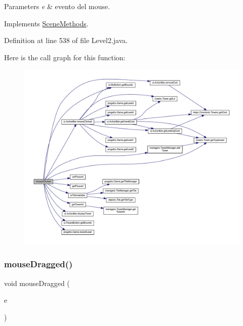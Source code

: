 \begin{DoxyParams}{Parameters}
{\em e} & evento del mouse. \\
\hline
\end{DoxyParams}


Implements \hyperlink{interfacescenes_1_1_scene_methods_a45d56bd84238e8b56589dfc732e2b2cf}{Scene\+Methods}.



Definition at line 538 of file Level2.\+java.

Here is the call graph for this function\+:\nopagebreak
\begin{figure}[H]
\begin{center}
\leavevmode
\includegraphics[width=350pt]{classscenes_1_1_level2_a45d56bd84238e8b56589dfc732e2b2cf_cgraph}
\end{center}
\end{figure}
\mbox{\label{classscenes_1_1_level2_adbfc0588c017133c9b7070474402b72f}} 
\subsubsection{\texorpdfstring{mouse\+Dragged()}{mouseDragged()}}
{\footnotesize\ttfamily void mouse\+Dragged (\begin{DoxyParamCaption}\item[{Mouse\+Event}]{e }\end{DoxyParamCaption})}



